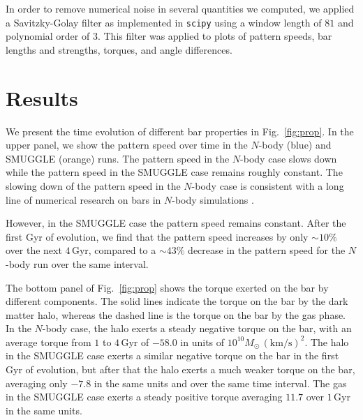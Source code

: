 \documentclass[fleqn,usenatbib]{mnras}
\newcommand{\Nbody}{$N$-body}
\begin{document}
In order to remove numerical noise in several quantities we computed, we
applied a Savitzky-Golay filter \citep{1964AnaCh..36.1627S} as implemented in
\texttt{scipy} using a window length of $81$ and polynomial order of $3$. This
filter was applied to plots of pattern speeds, bar lengths and strengths,
torques, and angle differences.

\section{Results}
\label{sec:results}

We present the time evolution of different bar properties in Fig.~\ref{fig:prop}.
In the upper panel, we show the pattern speed over time in the \Nbody{} (blue)
and SMUGGLE (orange) runs. The pattern speed in the \Nbody{} case slows down
while the pattern speed in the SMUGGLE case remains roughly constant. The
slowing down of the pattern speed in the \Nbody{} case is consistent with a long
line of numerical research on bars in \Nbody{} simulations
\citep{1992ApJ...400...80H, 2000ApJ...543..704D, 2002MNRAS.330...35A,
2002ApJ...569L..83A, 2003MNRAS.341.1179A, 2003MNRAS.346..251O,
2005MNRAS.363..991H, 2006ApJ...637..214M, 2007MNRAS.375..460W,
2009ApJ...697..293D}.

However, in the SMUGGLE case the pattern speed remains constant. After the first
Gyr of evolution, we find that the pattern speed increases by only $\sim10\%$
over the next $4\,\textrm{Gyr}$, compared to a $\sim43\%$ decrease in the
pattern speed for the \Nbody{} run over the same interval.

The bottom panel of Fig.~\ref{fig:prop} shows the torque exerted on the bar by
different components. The solid lines indicate the torque on the bar by the dark
matter halo, whereas the dashed line is the torque on the bar by the gas phase.
In the \Nbody{} case, the halo exerts a steady negative torque on the bar, with
an average torque from $1$ to $4\,\textrm{Gyr}$ of $-58.0$ in units of
$10^{10}M_{\odot}\,(\textrm{km}/\textrm{s})^2$. The halo in the SMUGGLE case
exerts a similar negative torque on the bar in the first Gyr of evolution, but
after that the halo exerts a much weaker torque on the bar, averaging only
$-7.8$ in the same units and over the same time interval. The gas in the SMUGGLE
case exerts a steady positive torque averaging $11.7$ over $1\,\textrm{Gyr}$ in
the same units.
\end{document}
